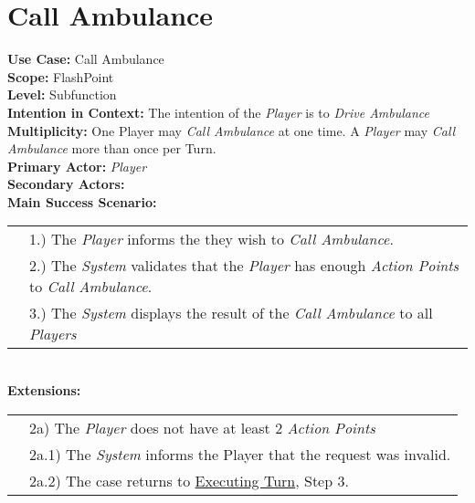 \documentclass{article}
\begin{document}
	\section*{Call Ambulance}
	\textbf{Use Case:} Call Ambulance\\
	\textbf{Scope:} FlashPoint\\
	\textbf{Level:} Subfunction\\
	\textbf{Intention in Context:} The intention of the \textit{Player} is to \textit{Drive Ambulance}\\
	\textbf{Multiplicity: } One Player may \textit{Call Ambulance} at one time. A \textit{Player} may \textit{Call Ambulance} more than once per Turn.\\
	\textbf{Primary Actor:} \textit{Player}\\
	\textbf{Secondary Actors:}\\
	\textbf{Main Success Scenario:}\\
	\begin{tabular}{l l}
		&1.) The \textit{Player} informs the \text{System} they wish to \textit{Call Ambulance}.\\
		&2.) The \textit{System} validates that the \textit{Player} has enough \textit{Action Points} to \textit{Call Ambulance}. \\
		&3.) The \textit{System} displays the result of the \textit{Call Ambulance} to all \textit{Players}
	\end{tabular}\\
	\textbf{Extensions: } \\
	\begin{tabular}{l l}
		&2a) The \textit{Player} does not have at least 2 \textit{Action Points} \\
		&\qquad2a.1) The \textit{System} informs the Player that the request was invalid. \\
		&\qquad2a.2) The case returns to \underline{Executing Turn}, Step 3.\\
	\end{tabular}
	
\end{document}
